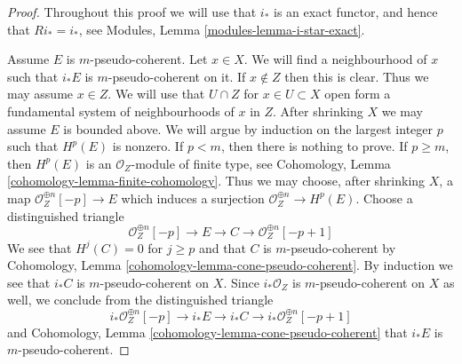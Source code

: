 \begin{proof}
Throughout this proof we will use that $i_*$ is an exact functor, and
hence that $Ri_* = i_*$, see Modules, Lemma \ref{modules-lemma-i-star-exact}.

\medskip\noindent
Assume $E$ is $m$-pseudo-coherent. Let $x \in X$. We will find a neighbourhood
of $x$ such that $i_*E$ is $m$-pseudo-coherent on it. If $x \not \in Z$
then this is clear. Thus we may assume $x \in Z$. We will use
that $U \cap Z$ for $x \in U \subset X$ open form a fundamental system of
neighbourhoods of $x$ in $Z$. After shrinking $X$ we may assume $E$ is
bounded above. We will argue by induction on
the largest integer $p$ such that $H^p(E)$ is nonzero. If $p < m$, then
there is nothing to prove. If $p \geq m$, then $H^p(E)$ is an
$\mathcal{O}_Z$-module of finite type, see
Cohomology, Lemma \ref{cohomology-lemma-finite-cohomology}.
Thus we may choose, after shrinking $X$, a map
$\mathcal{O}_Z^{\oplus n}[-p] \to E$ which induces a surjection
$\mathcal{O}_Z^{\oplus n} \to H^p(E)$. Choose a distinguished triangle
$$
\mathcal{O}_Z^{\oplus n}[-p] \to E \to C \to \mathcal{O}_Z^{\oplus n}[-p + 1]
$$
We see that $H^j(C) = 0$ for $j \geq p$ and that $C$ is $m$-pseudo-coherent
by Cohomology, Lemma \ref{cohomology-lemma-cone-pseudo-coherent}.
By induction we see that $i_*C$ is $m$-pseudo-coherent on $X$.
Since $i_*\mathcal{O}_Z$ is $m$-pseudo-coherent on $X$ as well, we conclude
from the distinguished triangle
$$
i_*\mathcal{O}_Z^{\oplus n}[-p] \to i_*E \to i_*C \to
i_*\mathcal{O}_Z^{\oplus n}[-p + 1]
$$
and 
Cohomology, Lemma \ref{cohomology-lemma-cone-pseudo-coherent}
that $i_*E$ is $m$-pseudo-coherent.


\end{proof}
